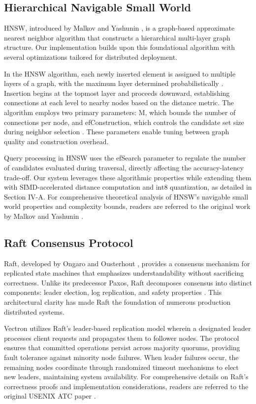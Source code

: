 \documentclass[conference]{IEEEtran}
\begin{document}
\subsection{Hierarchical Navigable Small World}

HNSW, introduced by Malkov and Yashunin \cite{hnsw}, is a graph-based approximate nearest neighbor algorithm that constructs a hierarchical multi-layer graph structure. Our implementation builds upon this foundational algorithm with several optimizations tailored for distributed deployment.

In the HNSW algorithm, each newly inserted element is assigned to multiple layers of a graph, with the maximum layer determined probabilistically \cite{hnsw}. Insertion begins at the topmost layer and proceeds downward, establishing connections at each level to nearby nodes based on the distance metric. The algorithm employs two primary parameters: M, which bounds the number of connections per node, and efConstruction, which controls the candidate set size during neighbor selection \cite{hnsw}. These parameters enable tuning between graph quality and construction overhead.

Query processing in HNSW uses the efSearch parameter to regulate the number of candidates evaluated during traversal, directly affecting the accuracy-latency trade-off. Our system leverages these algorithmic properties while extending them with SIMD-accelerated distance computation and int8 quantization, as detailed in Section IV-A. For comprehensive theoretical analysis of HNSW's navigable small world properties and complexity bounds, readers are referred to the original work by Malkov and Yashunin \cite{hnsw}.

\subsection{Raft Consensus Protocol}

Raft, developed by Ongaro and Ousterhout \cite{raft}, provides a consensus mechanism for replicated state machines that emphasizes understandability without sacrificing correctness. Unlike its predecessor Paxos, Raft decomposes consensus into distinct components: leader election, log replication, and safety properties \cite{raft}. This architectural clarity has made Raft the foundation of numerous production distributed systems.

Vectron utilizes Raft's leader-based replication model wherein a designated leader processes client requests and propagates them to follower nodes. The protocol ensures that committed operations persist across majority quorums, providing fault tolerance against minority node failures. When leader failures occur, the remaining nodes coordinate through randomized timeout mechanisms to elect new leaders, maintaining system availability. For comprehensive details on Raft's correctness proofs and implementation considerations, readers are referred to the original USENIX ATC paper \cite{raft}.
\end{document}
